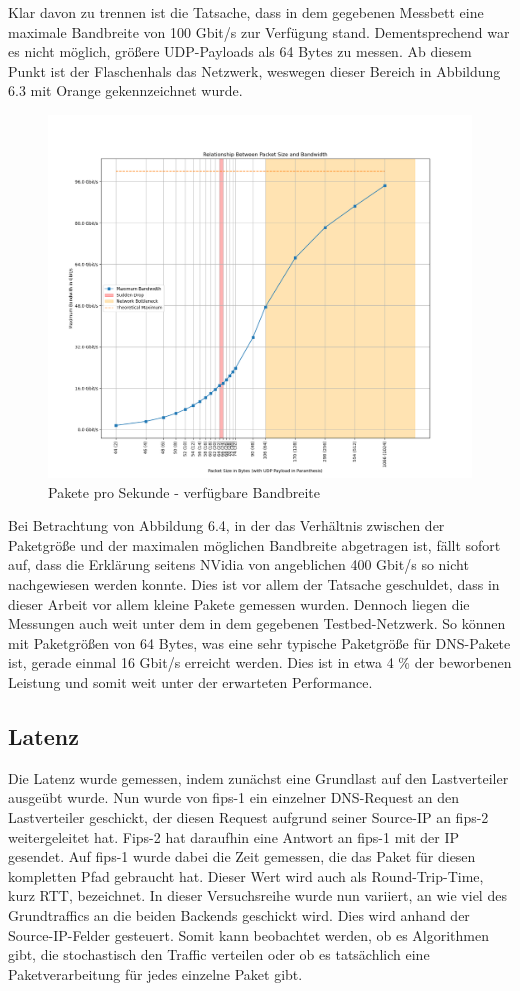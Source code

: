 Klar davon zu trennen ist die Tatsache, dass in dem gegebenen Messbett eine maximale Bandbreite von 100 Gbit/s zur Verfügung stand. Dementsprechend war es nicht möglich, größere UDP-Payloads als 64 Bytes zu messen. Ab diesem Punkt ist der Flaschenhals das Netzwerk, weswegen dieser Bereich in Abbildung 6.3 mit Orange gekennzeichnet wurde.
\begin{figure}
    \centering
    \includegraphics[width=1\linewidth]{images/pps_bandwidth.png}
    \caption{Pakete pro Sekunde - verfügbare Bandbreite}
    \label{fig:enter-label}
\end{figure}
Bei Betrachtung von Abbildung 6.4, in der das Verhältnis zwischen der Paketgröße und der maximalen möglichen Bandbreite abgetragen ist, fällt sofort auf, dass die Erklärung seitens NVidia von angeblichen 400 Gbit/s so nicht nachgewiesen werden konnte. Dies ist vor allem der Tatsache geschuldet, dass in dieser Arbeit vor allem kleine Pakete gemessen wurden. Dennoch liegen die Messungen auch weit unter dem in dem gegebenen Testbed-Netzwerk. So können mit Paketgrößen von 64 Bytes, was eine sehr typische Paketgröße für DNS-Pakete ist, gerade einmal 16 Gbit/s erreicht werden. Dies ist in etwa 4 \% der beworbenen Leistung und somit weit unter der erwarteten Performance. 
\subsection{Latenz}
Die Latenz wurde gemessen, indem zunächst eine Grundlast auf den Lastverteiler ausgeübt wurde. Nun wurde von fips-1 ein einzelner DNS-Request an den Lastverteiler geschickt, der diesen Request aufgrund seiner Source-IP an fips-2 weitergeleitet hat. Fips-2 hat daraufhin eine Antwort an fips-1 mit der IP gesendet. Auf fips-1 wurde dabei die Zeit gemessen, die das Paket für diesen kompletten Pfad gebraucht hat. Dieser Wert wird auch als Round-Trip-Time, kurz RTT, bezeichnet. In dieser Versuchsreihe wurde nun variiert, an wie viel des Grundtraffics an die beiden Backends geschickt wird. Dies wird anhand der Source-IP-Felder gesteuert. Somit kann beobachtet werden, ob es Algorithmen gibt, die stochastisch den Traffic verteilen oder ob es tatsächlich eine Paketverarbeitung für jedes einzelne Paket gibt.
